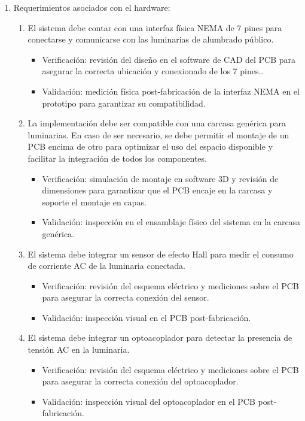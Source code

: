 \documentclass[
11pt, %
]{charter}
\begin{document}
\begin{enumerate}
	\item Requerimientos asociados con el hardware:
		\begin{enumerate}
			\item El sistema debe contar con una interfaz física NEMA de 7 pines para conectarse y comunicarse con las luminarias de alumbrado público.
				  \begin{itemize}
				\item Verificación: revisión del diseño en el software de CAD del PCB para asegurar la correcta ubicación y conexionado de los 7 pines..
				\item Validación:  medición física post-fabricación de la interfaz NEMA en el prototipo para garantizar su compatibilidad.
				\end{itemize}
			\item La implementación debe ser compatible con una carcasa genérica para luminarias. En caso de ser necesario, se debe permitir el montaje de un PCB encima de otro para optimizar el uso del espacio disponible y facilitar la integración de todos los componentes.
				\begin{itemize}
				\item Verificación: simulación de montaje en software 3D y revisión de dimensiones para garantizar que el PCB encaje en la carcasa y 	soporte el montaje en capas.
				\item Validación: inspección en el ensamblaje físico del sistema en la carcasa genérica.
				\end{itemize}
			\item  El sistema debe integrar un sensor de efecto Hall para medir el consumo de corriente AC de la luminaria conectada.
				\begin{itemize}
				\item Verificación: revisión del esquema eléctrico y mediciones sobre el PCB para asegurar la correcta conexión del sensor.
				\item Validación: inspección visual en el PCB post-fabricación.
				\end{itemize}
			\item El sistema debe integrar un optoacoplador para detectar la presencia de tensión AC en la luminaria.
				\begin{itemize}
				\item Verificación: revisión del esquema eléctrico y mediciones sobre el PCB para asegurar la correcta conexión del optoacoplador.
				\item Validación: inspección visual del optoacoplador en el PCB post-fabricación.

\end{itemize}
\end{enumerate}
\end{enumerate}
\end{document}
